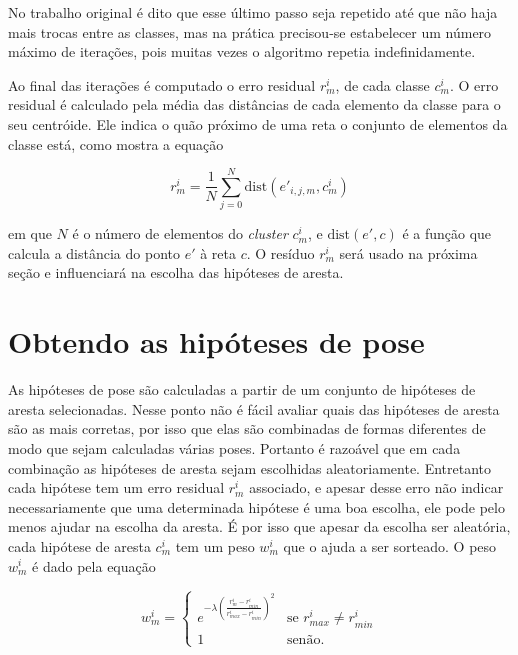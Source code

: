 
No trabalho original \cite{celine} é dito que esse último passo seja repetido até que não haja mais trocas entre as classes, mas na prática precisou-se estabelecer um número máximo de iterações, pois muitas vezes o algoritmo repetia indefinidamente. %


Ao final das iterações é computado o erro residual $r^i_m$, de cada classe $c^i_m$. O erro residual é calculado pela média das distâncias de cada elemento da classe para o seu centróide. Ele indica o quão próximo de uma reta o conjunto de elementos da classe está, como mostra a equação

\begin{equation}
r^i_m = \frac{1}{N} \sum^{N}_{j = 0} \text{dist} (e'_{i,j,m}, c^i_m)
\end{equation}

\noindent
em que $N$ é o número de elementos do \emph{cluster} $c^i_m$, e $\text{dist} (e', c)$ é a função que calcula a distância do ponto $e'$ à reta $c$. O resíduo $r^i_m$ será usado na próxima seção e influenciará na escolha das hipóteses de aresta.

\section{Obtendo as hipóteses de pose}

As hipóteses de pose são calculadas a partir de um conjunto de hipóteses de aresta selecionadas. Nesse ponto não é fácil avaliar quais das hipóteses de aresta são as mais corretas, por isso que elas são combinadas de formas diferentes de modo que sejam calculadas várias poses. Portanto é razoável que em cada combinação as hipóteses de aresta sejam escolhidas aleatoriamente. Entretanto cada hipótese tem um erro residual $r^i_m$ associado, e apesar desse erro não indicar necessariamente que uma determinada hipótese é uma boa escolha, ele pode pelo menos ajudar na escolha da aresta. É por isso que apesar da escolha ser aleatória, cada hipótese de aresta $c^i_m$ tem um peso $w^i_m$ que o ajuda a ser sorteado. O peso $w^i_m$ é dado pela equação

\begin{equation}
w^i_m = \begin{cases}
    e^{-\lambda \left( \frac{r^i_m - r^i_{min}}{r^i_{max} - r^i_{min}}\right)^2 } & \mbox{se } r^i_{max} \neq r^i_{min} \\
    1 & \mbox{senão}.
\end{cases}
\end{equation}

